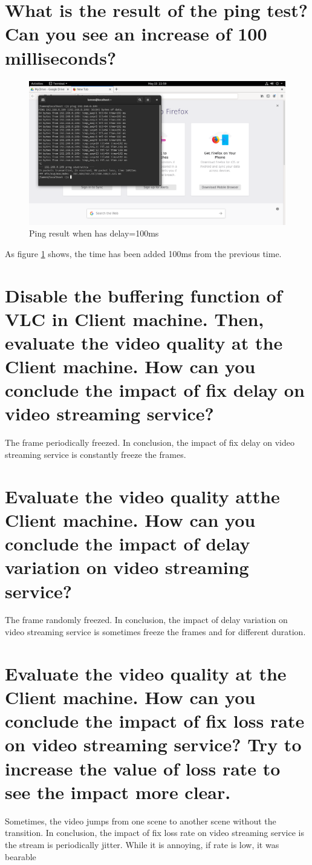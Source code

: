 \documentclass[11pt,a4paper]{report}
\begin{document}
	\section{What is the result of the ping test? Can you see an increase of 100 milliseconds?}
	\newpage
	\begin{figure}[h!]
  		\includegraphics[width=\linewidth]{ping-delay-100.png}
  		\caption{Ping result when has delay=100ms}
  		\label{fig:ping-100}
	\end{figure}
	
	As figure \ref{fig:ping-100} shows, the time has been added 100ms from the previous time.
	
	\section{Disable the buffering function of VLC in Client machine. Then, evaluate the video quality at the Client machine. How can you conclude the impact of fix delay on video streaming service?}
	The frame periodically freezed. In conclusion, the impact of fix delay on video streaming service is constantly freeze the frames.
	
	\section{Evaluate the video quality atthe Client machine. How can you conclude the impact of delay variation on video streaming service?}
	The frame randomly freezed. In conclusion, the impact of delay variation on video streaming service is sometimes freeze the frames and for different duration.
	
	\section{Evaluate the video quality at the Client machine. How can you conclude the impact of fix loss rate on video streaming service? Try to increase the value of loss rate to see the impact more clear.}
	Sometimes, the video jumps from one scene to another scene without the transition. In conclusion, the impact of fix loss rate on video streaming service is the stream is periodically jitter. While it is annoying, if rate is low, it was bearable
	
\end{document}
